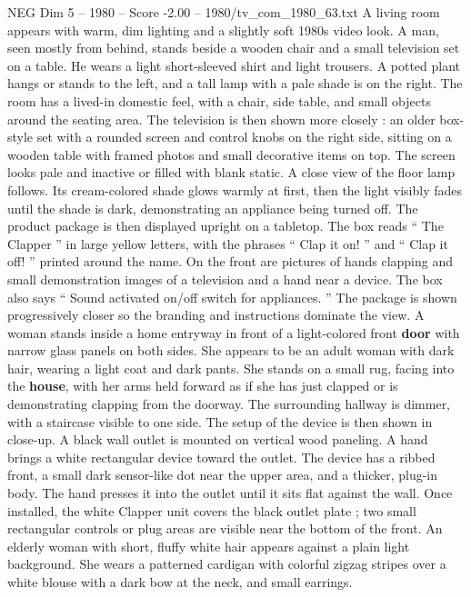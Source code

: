 \begin{textsample}{NEG Dim 5 – 1980 – Score -2.00 – 1980/tv\_com\_1980\_63.txt}  \label{ex:f5_neg_064}
A living room appears with warm, dim lighting and a slightly soft 1980s video look.
A man, seen mostly from behind, stands beside a wooden chair and a small television set on a table.
He wears a light short-sleeved shirt and light trousers.
A potted plant hangs or stands to the left, and a tall lamp with a pale shade is on the right.
The room has a lived-in domestic feel, with a chair, side table, and small objects around the seating area.
The television is then shown more closely : an older box-style set with a rounded screen and control knobs on the right side, sitting on a wooden table with framed photos and small decorative items on top.
The screen looks pale and inactive or filled with blank static.
A close view of the floor lamp follows.
Its cream-colored shade glows warmly at first, then the light visibly fades until the shade is dark, demonstrating an appliance being turned off.
The product package is then displayed upright on a tabletop.
The box reads “ The Clapper ” in large yellow letters, with the phrases “ Clap it on! ” and “ Clap it off! ” printed around the name.
On the front are pictures of hands clapping and small demonstration images of a television and a hand near a device.
The box also says “ Sound activated on/off switch for appliances. ” The package is shown progressively closer so the branding and instructions dominate the view.
A woman stands inside a home entryway in front of a light-colored front \textbf{door} with narrow glass panels on both sides.
She appears to be an adult woman with dark hair, wearing a light coat and dark pants.
She stands on a small rug, facing into the \textbf{house}, with her arms held forward as if she has just clapped or is demonstrating clapping from the doorway.
The surrounding hallway is dimmer, with a staircase visible to one side.
The setup of the device is then shown in close-up.
A black wall outlet is mounted on vertical wood paneling.
A hand brings a white rectangular device toward the outlet.
The device has a ribbed front, a small dark sensor-like dot near the upper area, and a thicker, plug-in body.
The hand presses it into the outlet until it sits flat against the wall.
Once installed, the white Clapper unit covers the black outlet plate ; two small rectangular controls or plug areas are visible near the bottom of the front.
An elderly woman with short, fluffy white hair appears against a plain light background.
She wears a patterned cardigan with colorful zigzag stripes over a white blouse with a dark bow at the neck, and small earrings.

\end{textsample}
